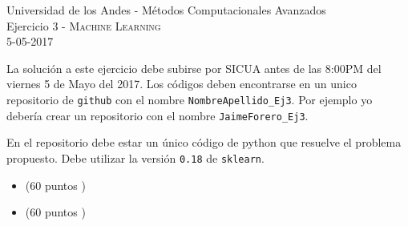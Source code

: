 \documentclass[11pt,letterpaper]{exam}
\begin{document}
\begin{center}
{\Large Universidad de los Andes - M\'etodos Computacionales Avanzados} \\
Ejercicio 3 - \textsc{Machine Learning}\\
5-05-2017\\
\end{center}



\vspace{0.3cm}


\noindent
La solución a este ejercicio debe subirse por SICUA antes de las 8:00PM
del viernes 5 de Mayo del 2017. 
Los c\'odigos deben encontrarse en un unico repositorio de \verb'github'
con el nombre \verb"NombreApellido_Ej3". Por ejemplo yo deber\'ia
crear un repositorio con el nombre
\verb"JaimeForero_Ej3". 

\noindent

En el repositorio debe estar un \'unico c\'odigo de python que
resuelve el problema propuesto. Debe utilizar la versi\'on \verb"0.18" de \verb"sklearn".

\vspace{0.3cm}

\begin{questions}
\begin{itemize}
\item (60 puntos )
\item (60 puntos )
\end{itemize}
\end{questions}
\end{document}
